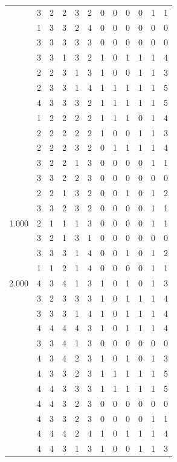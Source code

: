 \documentclass[]{msu-thesis}
\theoremstyle{definition}
\theoremstyle{definition}
\theoremstyle{definition}
\theoremstyle{remark}
\begin{document}
\begin{table}
{\begin{tabular}[t]{rrrrrrrrrrrr}
 & 3 & 2 & 2 & 3 & 2 & 0 & 0 & 0 & 0 & 1 & 1\\
 & 1 & 3 & 3 & 2 & 4 & 0 & 0 & 0 & 0 & 0 & 0\\
 & 3 & 3 & 3 & 3 & 3 & 0 & 0 & 0 & 0 & 0 & 0\\
 & 3 & 3 & 1 & 3 & 2 & 1 & 0 & 1 & 1 & 1 & 4\\
 & 2 & 2 & 3 & 1 & 3 & 1 & 0 & 0 & 1 & 1 & 3\\
 & 2 & 3 & 3 & 1 & 4 & 1 & 1 & 1 & 1 & 1 & 5\\
 & 4 & 3 & 3 & 3 & 2 & 1 & 1 & 1 & 1 & 1 & 5\\
 & 1 & 2 & 2 & 2 & 2 & 1 & 1 & 1 & 0 & 1 & 4\\
 & 2 & 2 & 2 & 2 & 2 & 1 & 0 & 0 & 1 & 1 & 3\\
 & 2 & 2 & 2 & 3 & 2 & 0 & 1 & 1 & 1 & 1 & 4\\
 & 3 & 2 & 2 & 1 & 3 & 0 & 0 & 0 & 0 & 1 & 1\\
 & 3 & 3 & 2 & 2 & 3 & 0 & 0 & 0 & 0 & 0 & 0\\
 & 2 & 2 & 1 & 3 & 2 & 0 & 0 & 1 & 0 & 1 & 2\\
 & 3 & 3 & 2 & 3 & 2 & 0 & 0 & 0 & 0 & 1 & 1\\
1.000 & 2 & 1 & 1 & 1 & 3 & 0 & 0 & 0 & 0 & 1 & 1\\
 & 3 & 2 & 1 & 3 & 1 & 0 & 0 & 0 & 0 & 0 & 0\\
 & 3 & 3 & 3 & 1 & 4 & 0 & 0 & 1 & 0 & 1 & 2\\
 & 1 & 1 & 2 & 1 & 4 & 0 & 0 & 0 & 0 & 1 & 1\\
2.000 & 4 & 3 & 4 & 1 & 3 & 1 & 0 & 1 & 0 & 1 & 3\\
 & 3 & 2 & 3 & 3 & 3 & 1 & 0 & 1 & 1 & 1 & 4\\
 & 3 & 3 & 3 & 1 & 4 & 1 & 0 & 1 & 1 & 1 & 4\\
 & 4 & 4 & 4 & 4 & 3 & 1 & 0 & 1 & 1 & 1 & 4\\
 & 3 & 3 & 4 & 1 & 3 & 0 & 0 & 0 & 0 & 0 & 0\\
 & 4 & 3 & 4 & 2 & 3 & 1 & 0 & 1 & 0 & 1 & 3\\
 & 4 & 3 & 3 & 2 & 3 & 1 & 1 & 1 & 1 & 1 & 5\\
 & 4 & 4 & 3 & 3 & 3 & 1 & 1 & 1 & 1 & 1 & 5\\
 & 4 & 4 & 3 & 2 & 3 & 0 & 0 & 0 & 0 & 0 & 0\\
 & 4 & 3 & 3 & 2 & 3 & 0 & 0 & 0 & 0 & 1 & 1\\
 & 4 & 4 & 4 & 2 & 4 & 1 & 0 & 1 & 1 & 1 & 4\\
 & 4 & 4 & 3 & 1 & 3 & 1 & 0 & 0 & 1 & 1 & 3\\

\end{tabular}}
\end{table}
\end{document}
